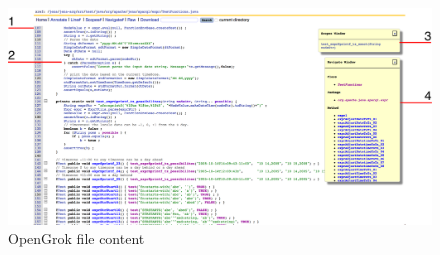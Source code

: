 \begin{figure}[htbp]
    \centering
    \includegraphics[width=145mm]{../img/opengrok_source.png}
    \caption{OpenGrok file content}
    \label{opengrok_source}
\end{figure}

